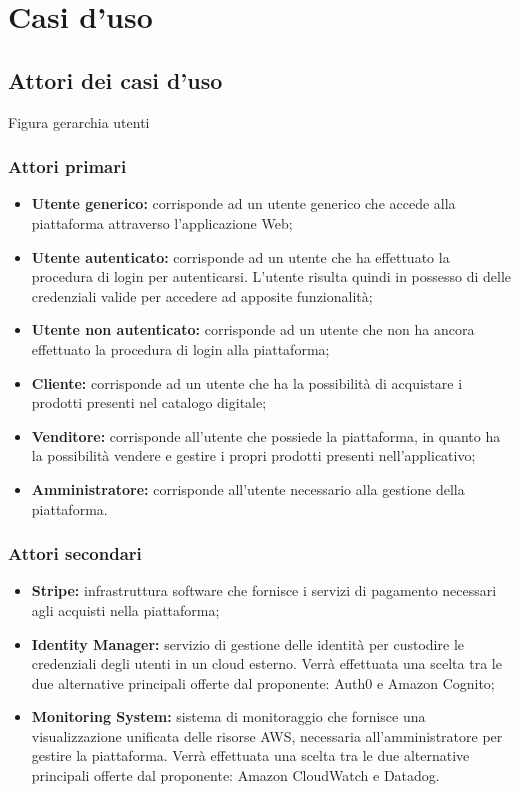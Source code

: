 \section{Casi d'uso}
\subsection{Attori dei casi d'uso}
Figura gerarchia utenti \\
\subsubsection{Attori primari}
\begin{itemize}
\item \textbf{Utente generico:} corrisponde ad un utente generico che accede alla piattaforma attraverso l'applicazione Web;
\item \textbf{Utente autenticato:} corrisponde ad un utente che ha effettuato la procedura di login per autenticarsi. L'utente risulta quindi in possesso di delle credenziali valide per accedere ad apposite funzionalità;
\item \textbf{Utente non autenticato:} corrisponde ad un utente che non ha ancora effettuato la procedura di login alla piattaforma;
\item \textbf{Cliente:} corrisponde ad un utente che ha la possibilità di acquistare i prodotti presenti nel catalogo digitale;
\item \textbf{Venditore:} corrisponde all'utente che possiede la piattaforma, in quanto ha la possibilità vendere e gestire i propri prodotti presenti nell'applicativo;
\item \textbf{Amministratore:} corrisponde all'utente necessario alla gestione della piattaforma.
\end{itemize}
\subsubsection{Attori secondari}
\begin{itemize}
\item \textbf{Stripe:} infrastruttura software che fornisce i servizi di pagamento necessari agli acquisti nella piattaforma;
\item \textbf{Identity Manager:} servizio di gestione delle identità per custodire le credenziali degli utenti in un cloud esterno. Verrà effettuata una scelta tra le due alternative principali offerte dal proponente: Auth0 e Amazon Cognito;
\item \textbf{Monitoring System:} sistema di monitoraggio che fornisce una visualizzazione unificata delle risorse AWS, necessaria all'amministratore per gestire la piattaforma. Verrà effettuata una scelta tra le due alternative principali offerte dal proponente: Amazon CloudWatch e Datadog.
\end{itemize}
